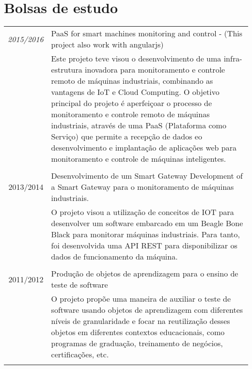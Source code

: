 \documentclass[a4paper,10pt]{article}
\begin{document}
\section{Bolsas de estudo}
\begin{tabular}{r|p{11cm}}

\emph{2015/2016} & PaaS for smart machines monitoring and control - (This project also work with angularjs)\\
&\footnotesize{Este projeto teve visou o desenvolvimento de uma infra-estrutura inovadora para monitoramento e controle remoto de máquinas industriais, combinando as vantagens de IoT e Cloud Computing. O objetivo principal do projeto é aperfeiçoar o processo de monitoramento e controle remoto de máquinas industriais, através de uma PaaS (Plataforma como Serviço) que permite a recepção de dados eo desenvolvimento e implantação de aplicações web para monitoramento e controle de máquinas inteligentes.} \\\multicolumn{2}{c}{} \\

\textsc{2013/2014} & Desenvolvimento de um Smart Gateway Development of a Smart Gateway para o monitoramento de máquinas industriais.\\
&\footnotesize{O projeto visou a utilização de conceitos de IOT para desenvolver um software embarcado em um Beagle Bone Black para monitorar máquinas industriais. Para tanto, foi desenvolvida uma API REST para disponibilizar os dados de funcionamento da máquina.}\\\multicolumn{2}{c}{} \\

\textsc{2011/2012} & Produção de objetos de aprendizagem para o ensino de teste de software\\
&\footnotesize{O projeto propõe uma maneira de auxiliar o teste de software usando objetos de aprendizagem com diferentes níveis de granularidade e focar na reutilização desses objetos em diferentes contextos educacionais, como programas de graduação, treinamento de negócios, certificações, etc.}\\\multicolumn{2}{c}{} \\

\end{tabular}

\end{document}
